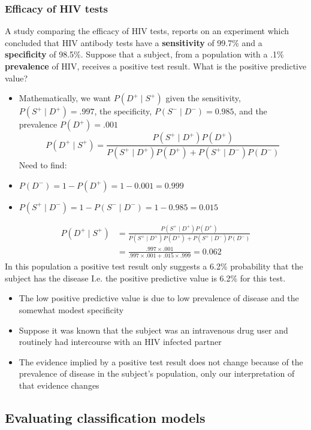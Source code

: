 \documentclass[a4paper]{article}
\begin{document}
\subsubsection{Efficacy of HIV tests}
A study comparing the efficacy of HIV tests, reports on an experiment which concluded that HIV antibody tests have a \textbf{sensitivity} of 99.7\% and a \textbf{specificity} of 98.5\%. Suppose that a subject, from a population with a .1\% \textbf{prevalence} of HIV, receives a positive test result. What is the positive predictive value?
\begin{itemize}
	\item Mathematically, we want \( P(D^+ \mid S^+) \) given the sensitivity, \( P(S^+ \mid D^+) =.997 \), the specificity, \( P(S^- \mid D^-) = 0.985 \), and the prevalence \( P(D^+) = .001 \)
	\[
		P(D^+ \mid S^+) = \frac{P(S^+ \mid D^+)P(D^+)}{P(S^+ \mid D^+)P(D^+) + P(S^+ \mid D^-)P(D^-)}
	\]
	Need to find:
	\item \( P(D^-) = 1-P(D^+) = 1- 0.001 = 0.999 \)
	\item \( P(S^+ \mid D^-) = 1-P(S^- \mid D^-) = 1 - 0.985 = 0.015 \) 
\end{itemize}
\begin{align*}
	P(D^+ \mid S^+) & = \frac{P(S^+ \mid D^+)P(D^+)}{P(S^+ \mid D^+)P(D^+) + P(S^+ \mid D^-)P(D^-)}\\
	& = \frac{.997\times .001}{.997 \times .001 + .015 \times .999}  = 0.062
\end{align*}
In this population a positive test result only suggests a 6.2\% probability that the subject has the disease I.e. the positive predictive value is 6.2\% for this test.
\begin{itemize}
	\item The low positive predictive value is due to low prevalence of disease and the somewhat modest specificity
	\item Suppose it was known that the subject was an intravenous drug user and routinely had intercourse with an HIV infected partner
	\item The evidence implied by a positive test result does not change because of the prevalence of disease in the subject's population, only our interpretation of that evidence changes
\end{itemize}
\subsection{Evaluating classification models}
\end{document}
